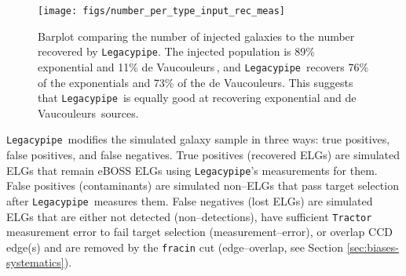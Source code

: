 \documentclass[a4paper,fleqn,usenatbib]{mnras}
\newcommand{\rhalf}{r_{\rm{half}}}
\newcommand{\gb}{$g$}
\newcommand{\rband}{$r$}
\newcommand{\zb}{$z$}
\newcommand{\tractor}{{\tt Tractor}}
\newcommand{\legacypipe}{{\tt Legacypipe}}
\newcommand{\dev}{de Vaucouleurs}
\begin{document}

\begin{figure}
 \texttt{[image: figs/number\_per\_type\_input\_rec\_meas]}
 \caption{Barplot comparing the number of injected galaxies to the number recovered by \legacypipe. The injected population is 89\% exponential and 11\% \dev\,, and \legacypipe\, recovers 76\% of the exponentials and 73\% of the \dev. This suggests that \legacypipe\, is equally good at recovering exponential and \dev\, sources.}
 \label{fig:number-per-type}
\end{figure}

\legacypipe\, modifies the simulated galaxy sample in three ways: true positives, false positives, and false negatives. True positives (recovered ELGs) are simulated ELGs that remain eBOSS ELGs using \legacypipe's measurements for them. False positives (contaminants) are simulated non--ELGs that pass target selection after \legacypipe\, measures them. False negatives (lost ELGs) are simulated ELGs that are either not detected (non--detections), have sufficient \tractor\, measurement error to fail target selection (measurement--error), or overlap CCD edge(s) and are removed by the {\tt{fracin}} cut (edge--overlap, see Section \ref{sec:biases-systematics}). 
\end{document}
